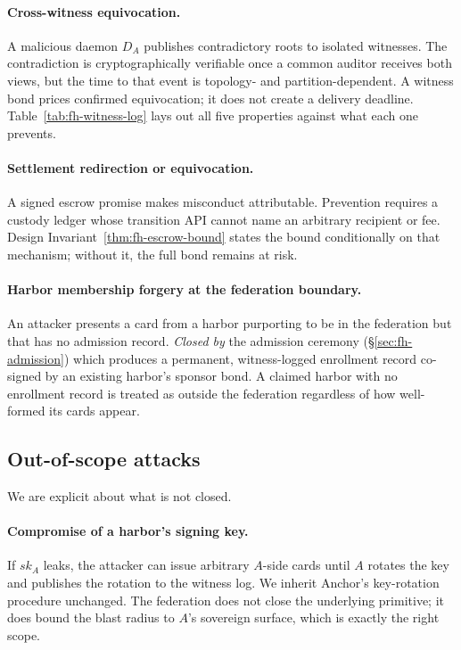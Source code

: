 \documentclass[11pt,a4paper]{article}
\theoremstyle{definition}
\theoremstyle{remark}
\begin{document}
\paragraph{Cross-witness equivocation.} A malicious daemon $D_A$ publishes contradictory roots to isolated witnesses. The contradiction is cryptographically verifiable once a common auditor receives both views, but the time to that event is topology- and partition-dependent. A witness bond prices confirmed equivocation; it does not create a delivery deadline.
Table~\ref{tab:fh-witness-log} lays out all five properties against what each one prevents.




\paragraph{Settlement redirection or equivocation.} A signed escrow promise makes misconduct attributable. Prevention requires a custody ledger whose transition API cannot name an arbitrary recipient or fee. Design Invariant~\ref{thm:fh-escrow-bound} states the bound conditionally on that mechanism; without it, the full bond remains at risk.

\paragraph{Harbor membership forgery at the federation boundary.} An attacker presents a card from a harbor purporting to be in the federation but that has no admission record. \emph{Closed by} the admission ceremony (\S\ref{sec:fh-admission}) which produces a permanent, witness-logged enrollment record co-signed by an existing harbor's sponsor bond. A claimed harbor with no enrollment record is treated as outside the federation regardless of how well-formed its cards appear.

\subsection{Out-of-scope attacks}\label{sec:fh-attacks-out}

We are explicit about what is not closed.

\paragraph{Compromise of a harbor's signing key.} If $\mathit{sk}_A$ leaks, the attacker can issue arbitrary $A$-side cards until $A$ rotates the key and publishes the rotation to the witness log. We inherit Anchor's key-rotation procedure unchanged. The federation does not close the underlying primitive; it does bound the blast radius to $A$'s sovereign surface, which is exactly the right scope.
\end{document}
